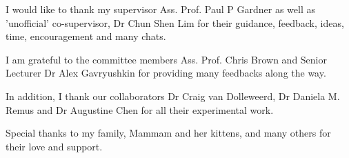 \begin{acknowledgements}
I would like to thank my supervisor Ass. Prof. Paul P Gardner as well as 'unofficial' co-supervisor, Dr Chun Shen Lim for their guidance, feedback, ideas, time, encouragement and many chats. 

I am grateful to the committee members Ass. Prof. Chris Brown and Senior Lecturer Dr Alex Gavryushkin for providing many feedbacks along the way. 

In addition, I thank our collaborators Dr Craig van Dolleweerd, Dr Daniela M. Remus and Dr Augustine Chen for all their experimental work.

Special thanks to my family, Mammam and her kittens, and many others for their love and support.

\end{acknowledgements}